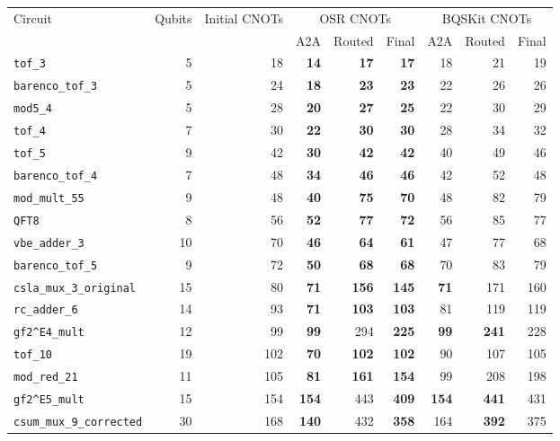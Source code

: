 \begin{table}[p]
\centering
\scriptsize
\begin{tabular}{lrr|rrr|rrr}
\hline
Circuit & Qubits & Initial CNOTs & \multicolumn{3}{c|}{OSR CNOTs} & \multicolumn{3}{c}{BQSKit CNOTs} \\
 & & & A2A & Routed & Final & A2A & Routed & Final \\
\hline
\texttt{tof\_3} & 5 & 18 & \textbf{14} & \textbf{17} & \textbf{17} & 18 & 21 & 19 \\
\texttt{barenco\_tof\_3} & 5 & 24 & \textbf{18} & \textbf{23} & \textbf{23} & 22 & 26 & 26 \\
\texttt{mod5\_4} & 5 & 28 & \textbf{20} & \textbf{27} & \textbf{25} & 22 & 30 & 29 \\
\texttt{tof\_4} & 7 & 30 & \textbf{22} & \textbf{30} & \textbf{30} & 28 & 34 & 32 \\
\texttt{tof\_5} & 9 & 42 & \textbf{30} & \textbf{42} & \textbf{42} & 40 & 49 & 46 \\
\texttt{barenco\_tof\_4} & 7 & 48 & \textbf{34} & \textbf{46} & \textbf{46} & 42 & 52 & 48 \\
\texttt{mod\_mult\_55} & 9 & 48 & \textbf{40} & \textbf{75} & \textbf{70} & 48 & 82 & 79 \\
\texttt{QFT8} & 8 & 56 & \textbf{52} & \textbf{77} & \textbf{72} & 56 & 85 & 77 \\
\texttt{vbe\_adder\_3} & 10 & 70 & \textbf{46} & \textbf{64} & \textbf{61} & 47 & 77 & 68 \\
\texttt{barenco\_tof\_5} & 9 & 72 & \textbf{50} & \textbf{68} & \textbf{68} & 70 & 83 & 79 \\
\texttt{csla\_mux\_3\_original} & 15 & 80 & \textbf{71} & \textbf{156} & \textbf{145} & \textbf{71} & 171 & 160 \\
\texttt{rc\_adder\_6} & 14 & 93 & \textbf{71} & \textbf{103} & \textbf{103} & 81 & 119 & 119 \\
\texttt{gf2\textasciicircum{}E4\_mult} & 12 & 99 & \textbf{99} & 294 & \textbf{225} & \textbf{99} & \textbf{241} & 228 \\
\texttt{tof\_10} & 19 & 102 & \textbf{70} & \textbf{102} & \textbf{102} & 90 & 107 & 105 \\
\texttt{mod\_red\_21} & 11 & 105 & \textbf{81} & \textbf{161} & \textbf{154} & 99 & 208 & 198 \\
\texttt{gf2\textasciicircum{}E5\_mult} & 15 & 154 & \textbf{154} & 443 & \textbf{409} & \textbf{154} & \textbf{441} & 431 \\
\texttt{csum\_mux\_9\_corrected} & 30 & 168 & \textbf{140} & 432 & \textbf{358} & 164 & \textbf{392} & 375 \\

\end{tabular}
\end{table}
